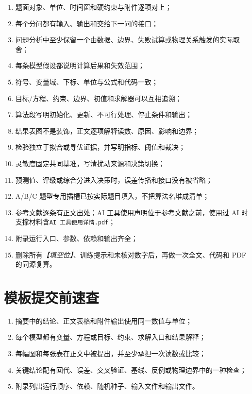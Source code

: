 \documentclass[UTF8,zihao=-4]{ctexart}
\newcommand{\slot}[1]{\textcolor{inkblue}{\textit{【#1】}}}
\begin{document}
\begin{enumerate}
  \item 题面对象、单位、时间窗和硬约束与附件逐项对上；
  \item 每个分问都有输入、输出和交给下一问的接口；
  \item 问题分析中至少保留一个由数据、边界、失败试算或物理关系触发的实际取舍；
  \item 每条模型假设都说明计算后果和失效范围；
  \item 符号、变量域、下标、单位与公式和代码一致；
  \item 目标/方程、约束、边界、初值和求解器可以互相追溯；
  \item 算法段写明初始化、更新、不可行处理、停止条件和输出；
  \item 结果表图不是装饰，正文逐项解释读数、原因、影响和边界；
  \item 检验独立于拟合或寻优证据，并写明指标、阈值和裁决；
  \item 灵敏度固定共同基准，写清扰动来源和决策切换；
  \item 预测值、评级或综合分进入决策时，误差传播和接口没有被省略；
  \item A/B/C 题型专用插槽已按实际题目填入，不把算法名堆成清单；
  \item 参考文献逐条有正文出处；AI 工具使用声明位于参考文献之前，使用过 AI 时支撑材料含\texttt{AI 工具使用详情.pdf}；
  \item 附录运行入口、参数、依赖和输出齐全；
  \item 删除所有\slot{填空位}、训练提示和未核对数字后，再做一次全文、代码和 PDF 的同源复算。
\end{enumerate}

\appendix
\section{模板提交前速查}

\begin{enumerate}
  \item 摘要中的结论、正文表格和附件输出使用同一数值与单位；
  \item 每个模型都有变量、方程或目标、约束、求解入口和结果解释；
  \item 每幅图和每张表在正文中被提出，并至少承担一次读数或比较；
  \item 关键结论配有回代、误差、交叉验证、基线、反例或物理边界中的一种检查；
  \item 附录列出运行顺序、依赖、随机种子、输入文件和输出文件。
\end{enumerate}
\end{document}
